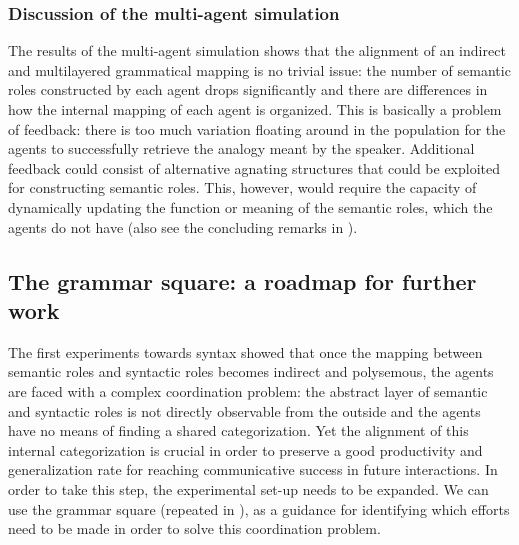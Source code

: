\subsubsection{Discussion of the multi-agent simulation}
 The results of the multi-agent simulation shows that the alignment of an indirect and multilayered grammatical mapping is no trivial issue: the number of semantic roles constructed by each agent drops significantly and there are differences in how the internal mapping of each agent is organized. This is basically a problem of feedback: there is too much variation floating around in the population for the agents to successfully retrieve the analogy meant by the speaker. Additional feedback could consist of alternative agnating structures that could be exploited for constructing semantic roles. This, however, would require the capacity of dynamically updating the function or meaning of the semantic roles, which the agents do not have (also see the concluding remarks in ).

\subsection{The grammar square: a roadmap for further work}
\label{s:future}


The first experiments towards syntax showed that once the mapping between semantic roles and syntactic roles becomes indirect and polysemous, the agents are faced with a complex coordination problem: the abstract layer of semantic and syntactic roles is not directly observable from the outside and the agents have no means of finding a shared categorization. Yet the alignment of this internal categorization is crucial in order to preserve a good productivity and generalization rate for reaching communicative success in future interactions. In order to take this step, the experimental set-up needs to be expanded. We can use the grammar square (repeated in ), as a guidance for identifying which efforts need to be made in order to solve this coordination problem.

